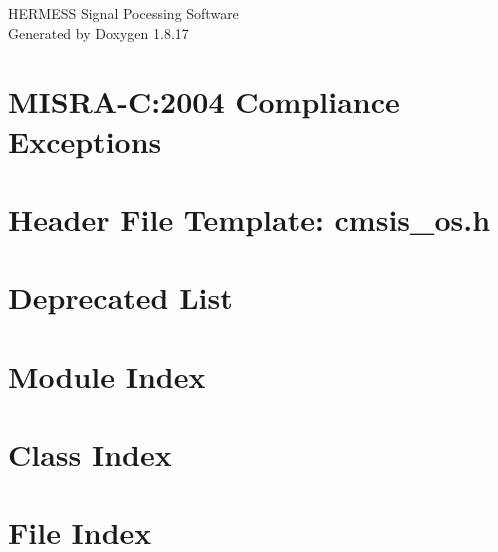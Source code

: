\let\mypdfximage\pdfximage\def\pdfximage{\immediate\mypdfximage}\documentclass[twoside]{book}
\newcommand{\+}{\discretionary{\mbox{\scriptsize$\hookleftarrow$}}{}{}}
\newcommand{\clearemptydoublepage}{%
  \newpage{\pagestyle{empty}\cleardoublepage}%
}
\begin{document}
\hypersetup{pageanchor=false,
             bookmarksnumbered=true,
             pdfencoding=unicode
            }
\begin{titlepage}
\vspace*{7cm}
\begin{center}%
{\Large H\+E\+R\+M\+E\+SS Signal Pocessing Software }\\
\vspace*{1cm}
{\large Generated by Doxygen 1.8.17}\\
\end{center}
\end{titlepage}
\clearemptydoublepage
{}
\tableofcontents
\clearemptydoublepage
{}
\hypersetup{pageanchor=true}

\chapter{M\+I\+S\+R\+A-\/C\+:2004 Compliance Exceptions}
\label{_c_m_s_i_s__m_i_s_r_a__exceptions}

\chapter{Header File Template\+: cmsis\+\_\+os.\+h}
\label{cmsis_os_h}

\chapter{Deprecated List}
\label{deprecated}

\chapter{Module Index}

\chapter{Class Index}

\chapter{File Index}

\end{document}
